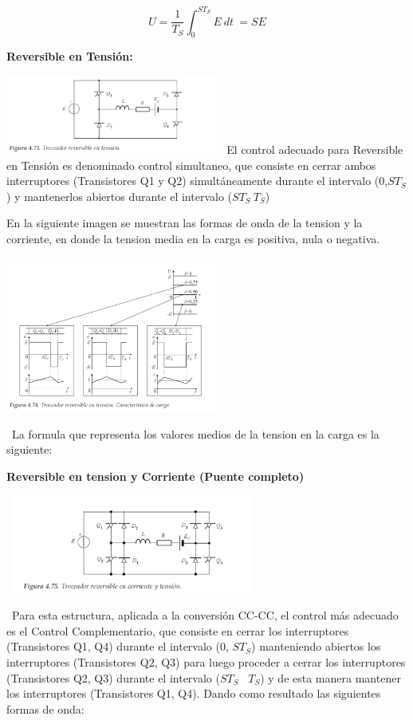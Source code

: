 \documentclass[12pt,letterpaper]{article}
\begin{document}
$$ U= \frac{1}{T_S} \int_{0}^{ST_S} E \ dt \ = SE  $$

\newpage

\textbf{Reversible en Tensión:}
\

\includegraphics[width=7cm]{Reversible en Tension.png} 
\
El control adecuado para Reversible en Tensión es denominado control simultaneo, que consiste en cerrar ambos interruptores (Transistores Q1 y Q2) simultáneamente durante el intervalo (0,$ST_S$) y mantenerlos abiertos durante el intervalo ($ST_S  \  T_S $)

En la siguiente imagen se muestran las formas de onda de la tension y la corriente, en donde la tension media en la carga es positiva, nula o negativa.
\

\includegraphics[width=7cm]{Caracteristicas de carga.png} 


\
La formula que representa los valores medios de la tension en la carga es la siguiente:
\

\textbf{Reversible en tension y Corriente (Puente completo)}
\

\
\includegraphics[width=8cm]{Full bridge.png} 

\
Para esta estructura, aplicada a la conversión CC-CC, el control más adecuado es el Control Complementario, que consiste en cerrar los interruptores (Transistores Q1, Q4) durante el intervalo (0, $ST_S$) manteniendo abiertos los interruptores (Transistores Q2, Q3) para luego proceder a cerrar los interruptores (Transistores Q2, Q3) durante el intervalo ($ST_S$ \ $T_S$) y de esta manera mantener los interruptores (Transistores Q1, Q4).
\newpage
Dando como resultado las siguientes formas de onda:
\
\end{document}
